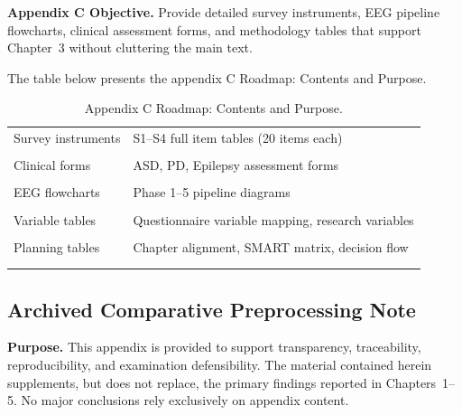 


\noindent\textbf{Appendix C Objective.} Provide detailed survey instruments, EEG pipeline flowcharts, clinical assessment forms, and methodology tables that support Chapter~3 without cluttering the main text.

\noindent The table below presents the appendix C Roadmap: Contents and Purpose.

\begin{table}[!htbp]
\centering
\caption{Appendix C Roadmap: Contents and Purpose.}
\tablestripes\tablefontsize
\begin{tabularx}{\textwidth}{@{} >{\raggedright\arraybackslash}p{3.0cm} L @{}}
\toprule
{} &  \\
\midrule
Survey instruments & S1--S4 full item tables (20 items each) \\\\\addlinespace
Clinical forms & ASD, PD, Epilepsy assessment forms \\\\\addlinespace
EEG flowcharts & Phase 1--5 pipeline diagrams \\\\\addlinespace
Variable tables & Questionnaire variable mapping, research variables \\\\\addlinespace
Planning tables & Chapter alignment, SMART matrix, decision flow \\\\\addlinespace
\bottomrule
\end{tabularx}
\end{table}


\subsection{Archived Comparative Preprocessing Note}


\noindent\textbf{Purpose.} This appendix is provided to support transparency, traceability, reproducibility, and examination defensibility. The material contained herein supplements, but does not replace, the primary findings reported in Chapters~1--5. No major conclusions rely exclusively on appendix content.


